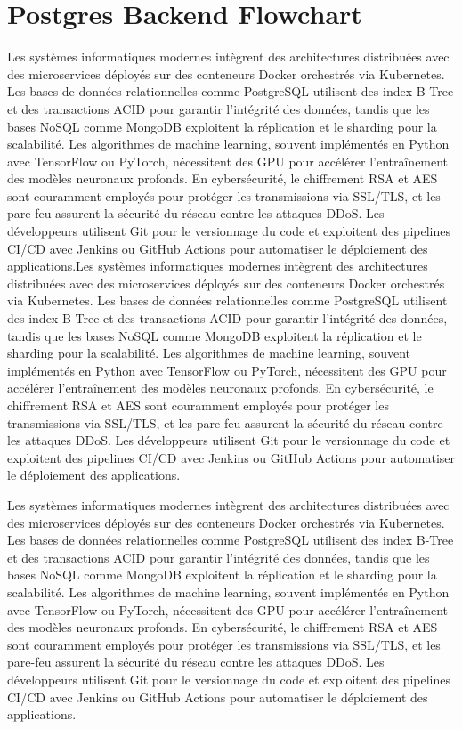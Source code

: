 \section{Postgres Backend Flowchart}  
\label{sec:pg-backend-flowchart}
Les systèmes informatiques modernes intègrent des architectures distribuées avec des microservices déployés sur des conteneurs Docker orchestrés via Kubernetes. Les bases de données relationnelles comme PostgreSQL utilisent des index B-Tree et des transactions ACID pour garantir l'intégrité des données, tandis que les bases NoSQL comme MongoDB exploitent la réplication et le sharding pour la scalabilité. Les algorithmes de machine learning, souvent implémentés en Python avec TensorFlow ou PyTorch, nécessitent des GPU pour accélérer l'entraînement des modèles neuronaux profonds. En cybersécurité, le chiffrement RSA et AES sont couramment employés pour protéger les transmissions via SSL/TLS, et les pare-feu assurent la sécurité du réseau contre les attaques DDoS. Les développeurs utilisent Git pour le versionnage du code et exploitent des pipelines CI/CD avec Jenkins ou GitHub Actions pour automatiser le déploiement des applications.Les systèmes informatiques modernes intègrent des architectures distribuées avec des microservices déployés sur des conteneurs Docker orchestrés via Kubernetes. Les bases de données relationnelles comme PostgreSQL utilisent des index B-Tree et des transactions ACID pour garantir l'intégrité des données, tandis que les bases NoSQL comme MongoDB exploitent la réplication et le sharding pour la scalabilité. Les algorithmes de machine learning, souvent implémentés en Python avec TensorFlow ou PyTorch, nécessitent des GPU pour accélérer l'entraînement des modèles neuronaux profonds. En cybersécurité, le chiffrement RSA et AES sont couramment employés pour protéger les transmissions via SSL/TLS, et les pare-feu assurent la sécurité du réseau contre les attaques DDoS. Les développeurs utilisent Git pour le versionnage du code et exploitent des pipelines CI/CD avec Jenkins ou GitHub Actions pour automatiser le déploiement des applications.



Les systèmes informatiques modernes intègrent des architectures distribuées avec des microservices déployés sur des conteneurs Docker orchestrés via Kubernetes. Les bases de données relationnelles comme PostgreSQL utilisent des index B-Tree et des transactions ACID pour garantir l'intégrité des données, tandis que les bases NoSQL comme MongoDB exploitent la réplication et le sharding pour la scalabilité. Les algorithmes de machine learning, souvent implémentés en Python avec TensorFlow ou PyTorch, nécessitent des GPU pour accélérer l'entraînement des modèles neuronaux profonds. En cybersécurité, le chiffrement RSA et AES sont couramment employés pour protéger les transmissions via SSL/TLS, et les pare-feu assurent la sécurité du réseau contre les attaques DDoS. Les développeurs utilisent Git pour le versionnage du code et exploitent des pipelines CI/CD avec Jenkins ou GitHub Actions pour automatiser le déploiement des applications.

